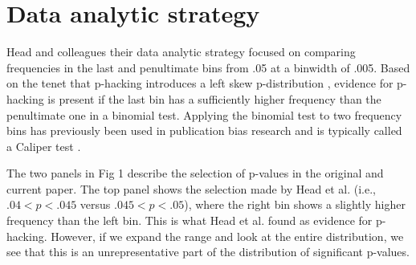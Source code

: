 \section*{Data analytic strategy}
Head and colleagues their data analytic strategy focused on comparing frequencies in the last and penultimate bins from .05 at a binwidth of .005. Based on the tenet that p-hacking introduces a left skew p-distribution \cite{Simonsohn2014}, evidence for p-hacking is present if the last bin has a sufficiently higher frequency than the penultimate one in a binomial test. Applying the binomial test to two frequency bins has previously been used in publication bias research and is typically called a Caliper test \cite{gerber2010, kuhberger2014}.

The two panels in Fig 1 describe the selection of p-values in the original and current paper. The top panel shows the selection made by Head et al. (i.e., $.04<p< .045$ versus $.045<p<.05$), where the right bin shows a slightly higher frequency than the left bin. This is what Head et al. found as evidence for p-hacking. However, if we expand the range and look at the entire distribution, we see that this is an unrepresentative part of the distribution of significant p-values.
  